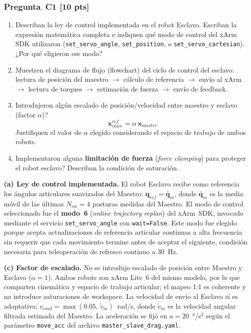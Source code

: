\documentclass[journal,10pt,twoside]{IEEEtran}
\newcommand{\pts}[1]{\textbf{\color{tec_red}[#1 pts]}}
\begin{document}
\subsubsection*{Pregunta~C1 \pts{10}}
\begin{enumerate}[label=(\alph*)]
  \item Describan la ley de control implementada en el robot Esclavo.
        Escriban la expresión matemática completa e indiquen qué modo
        de control del xArm SDK utilizaron
        (\texttt{set\_servo\_angle}, \texttt{set\_position},
        o \texttt{set\_servo\_cartesian}).
        ¿Por qué eligieron ese modo?
  \item Muestren el diagrama de flujo (flowchart) del ciclo de control
        del esclavo: lectura de posición del maestro $\rightarrow$
        cálculo de referencia $\rightarrow$ envío al xArm $\rightarrow$
        lectura de torques $\rightarrow$ estimación de fuerza
        $\rightarrow$ envío de feedback.
  \item Introdujeron algún escalado de posición/velocidad entre
        maestro y esclavo (factor $\alpha$)?
        \[
          \bm{x}_{slave}^{ref} = \alpha\,\bm{x}_{master}
        \]
        Justifiquen el valor de $\alpha$ elegido considerando
        el espacio de trabajo de ambos robots.
  \item Implementaron alguna \textbf{limitación de fuerza}
        (\textit{force clamping}) para proteger el robot esclavo?
        Describan la condición de saturación.
\end{enumerate}

\textbf{(a) Ley de control implementada.}
El robot Esclavo recibe como referencia los ángulos articulares
suavizados del Maestro: $\bm{q}_{ref} = \bar{\bm{q}}_m$, donde
$\bar{\bm{q}}_m$ es la media móvil de las últimas
$N_{sw}{=}4$ posturas medidas del Maestro. El modo de control
seleccionado fue el \textbf{modo~6} (\textit{online trajectory
replan}) del xArm~SDK, invocado mediante el servicio
\texttt{set\_servo\_angle} con \texttt{wait=False}. Este modo fue
elegido porque acepta actualizaciones de referencia articular
continuas a alta frecuencia sin requerir que cada movimiento
termine antes de aceptar el siguiente, condición necesaria para
teleoperación de refresco continuo a 30~Hz.

\textbf{(c) Factor de escalado.}
No se introdujo escalado de posición entre Maestro y Esclavo
($\alpha{=}1$). Ambos robots son xArm Lite~6 del mismo modelo,
por lo que comparten cinemática y espacio de trabajo articular;
el mapeo 1:1 es coherente y no introduce saturaciones de workspace.
La velocidad de envío al Esclavo sí es adaptativa:
$v_{cmd} = \max(0.05,\, \tilde{v}_m)$~rad/s, donde
$\tilde{v}_m$ es la velocidad angular filtrada estimada del Maestro.
La aceleración se fijó en $a = 20$~°/s$^2$ según el parámetro
\texttt{move\_acc} del archivo \texttt{master\_slave\_drag.yaml}.
\end{document}
